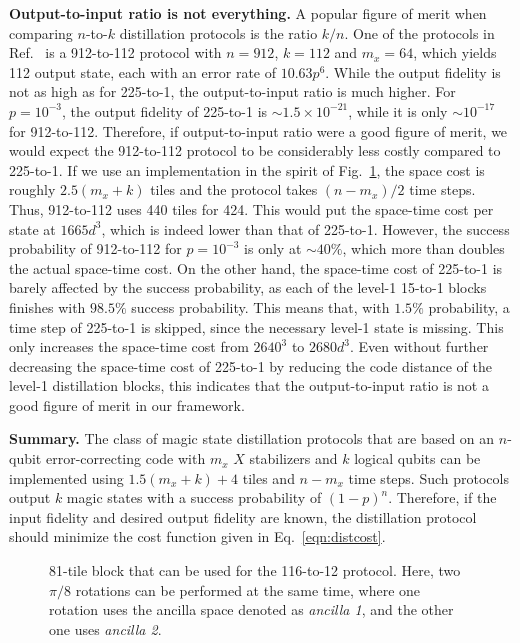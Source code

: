 \documentclass[prx,aps,letterpaper,twocolumn,allowfontchageintitle=true,accepted=2019-02-01]{quantumarticle}
\begin{document}
\textbf{Output-to-input ratio is not everything.} A popular figure of merit when comparing $n$-to-$k$ distillation protocols is the ratio $k/n$. One of the protocols in Ref.~\cite{Haah2018} is a 912-to-112 protocol with $n=912$, $k=112$ and $m_x=64$, which yields 112 output state, each with an error rate of $10.63p^6$. While the output fidelity is not as high as for 225-to-1, the output-to-input ratio is much higher. For $p=10^{-3}$, the output fidelity of 225-to-1 is ${\sim} 1.5 \times 10^{-21}$, while it is only ${\sim} 10^{-17}$ for 912-to-112. Therefore, if output-to-input ratio were a good figure of merit, we would expect the 912-to-112 protocol to be considerably less costly compared to 225-to-1. If we use an implementation in the spirit of Fig.~\ref{fig:116to12}, the space cost is roughly $2.5(m_x+k)$ tiles and the protocol takes $(n-m_x)/2$ time steps. Thus, 912-to-112 uses 440 tiles for 424\clock. This would put the space-time cost per state at $1665d^3$, which is indeed lower than that of 225-to-1. However, the success probability of 912-to-112 for $p=10^{-3}$ is only at ${\sim}40\%$, which more than doubles the actual space-time cost. On the other hand, the space-time cost of 225-to-1 is barely affected by the success probability, as each of the level-1 15-to-1 blocks finishes with $98.5\%$ success probability. This means that, with $1.5\%$ probability, a time step of 225-to-1 is skipped, since the necessary level-1 state is missing. This only increases the space-time cost from $2640^3$ to $2680d^3$. Even without further decreasing the space-time cost of 225-to-1 by reducing the code distance of the level-1 distillation blocks, this indicates that the output-to-input ratio is not a good figure of merit in our framework.

\textbf{Summary.} The class of magic state distillation protocols that are based on an $n$-qubit error-correcting code with $m_x$ $X$ stabilizers and $k$ logical qubits can be implemented using $1.5(m_x+k)+4$ tiles and $n-m_x$ time steps. Such protocols output $k$ magic states with a success probability of $(1-p)^n$. Therefore, if the input fidelity and desired output fidelity are known, the distillation protocol should minimize the cost function given in Eq.~\eqref{eqn:distcost}.

\begin{figure}[t!]
\centering
\def\svgwidth{0.8\linewidth}

\caption{81-tile block that can be used for the 116-to-12 protocol. Here, two $\pi/8$ rotations can be performed at the same time, where one rotation uses the ancilla space denoted as \textit{ancilla 1}, and the other one uses \textit{ancilla 2}.}
\label{fig:116to12}
\end{figure}
\end{document}
